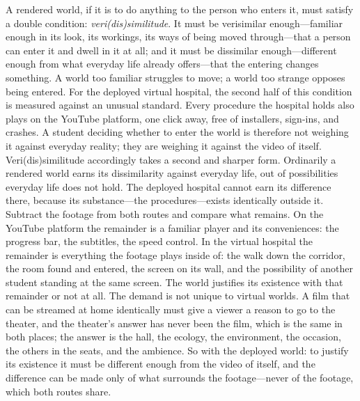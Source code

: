 A rendered world, if it is to do anything to the person who enters it,
must satisfy a double condition: \textit{veri(dis)similitude}. It must
be verisimilar enough---familiar enough in its look, its workings, its
ways of being moved through---that a person can enter it and dwell in
it at all; and it must be dissimilar enough---different enough from
what everyday life already offers---that the entering changes
something. A world too familiar struggles to move; a world too strange
opposes being entered. For the deployed virtual hospital, the second half
of this condition is measured against an unusual standard. Every
procedure the hospital holds also plays on the YouTube platform, one
click away, free of installers, sign-ins, and crashes. A student
deciding whether to enter the world is therefore not weighing it
against everyday reality; they are weighing it against the video of
itself. Veri(dis)similitude accordingly takes a second and sharper form.
Ordinarily a rendered world earns its dissimilarity against everyday
life, out of possibilities everyday life does not hold. The deployed hospital
cannot earn its difference there, because its substance---the
procedures---exists identically outside it. Subtract the footage from
both routes and compare what remains. On the YouTube platform the
remainder is a familiar player and its conveniences: the progress bar,
the subtitles, the speed control. In the virtual hospital the
remainder is everything the footage plays inside of: the walk down the
corridor, the room found and entered, the screen on its wall, and the
possibility of another student standing at the same screen. The world
justifies its existence with that remainder or not at all. The demand
is not unique to virtual worlds. A film that can be streamed at home
identically must give a viewer a reason to go to the theater, and the
theater's answer has never been the film, which is the same in both
places; the answer is the hall, the ecology, the environment, the occasion,
the others in the seats, and the ambience. So with the deployed world: to justify its existence it must be
different enough from the video of itself, and the difference can be
made only of what surrounds the footage---never of the footage, which
both routes share.

